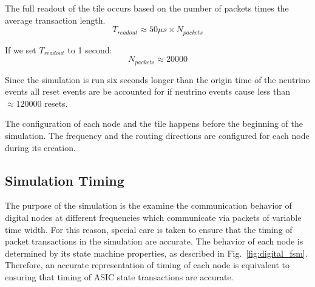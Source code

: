 The full readout of the tile occurs based on the number of packets times the average transaction length.
$$
T_{readout} \approx 50 \mu s \times N_{packets}
$$

If we set $T_{readout}$ to 1 second:
$$
N_{packets} \approx  20000
$$

Since the simulation is run six seconds longer than the origin time of the neutrino events all reset events are be accounted for if neutrino events cause less than $\approx 120000$ resets.

The configuration of each node and the tile happens before the beginning of the simulation.
The frequency and the routing directions are configured for each node during its creation.

\subsection{Simulation Timing}

The purpose of the simulation is the examine the communication behavior of digital nodes at different frequencies which communicate via packets of variable time width.
For this reason, special care is taken to ensure that the timing of packet transactions in the simulation are accurate.
The behavior of each node is determined by its state machine properties, as described in Fig.~\ref{fig:digital_fsm}.
Therefore, an accurate representation of timing of each node is equivalent to ensuring that timing of ASIC state transactions are accurate.

